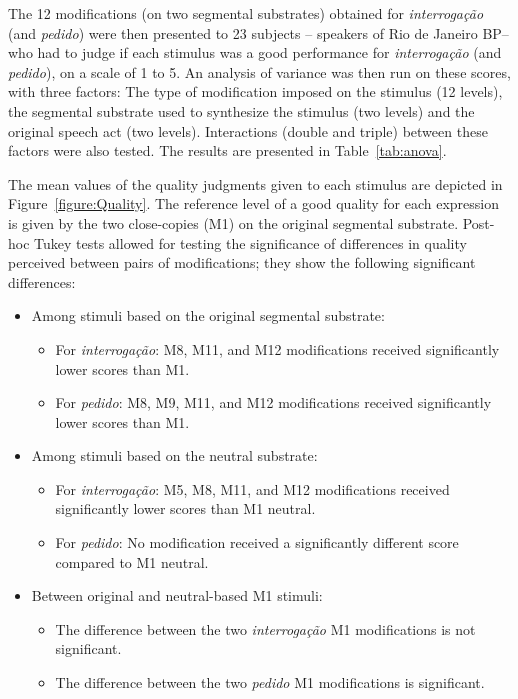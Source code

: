 \documentclass[output=paper]{LSP/langsci}
\begin{document}
The 12 modifications (on two segmental substrates) obtained for \textit{interrogação} (and \textit{pedido}) were then presented to 23 subjects -- speakers of Rio de Janeiro BP--who had to judge if each stimulus was a good performance for \textit{interrogação} (and \textit{pedido}), on a scale of 1 to 5. 
An analysis of variance was then run on these scores, with three factors: The type of modification imposed on the stimulus (12 levels), the segmental substrate used to synthesize the stimulus (two levels) and the original speech act (two levels). 
Interactions (double and triple) between these factors were also tested. 
The results are presented in Table~\ref{tab:anova}.



The mean values of the quality judgments given to each stimulus are depicted in Figure~\ref{figure:Quality}. 
The reference level of a good quality for each expression is given by the two close-copies (M1) on the original segmental substrate. 
Post-hoc Tukey tests allowed for testing the significance of differences in quality perceived between pairs of modifications; they show the following significant differences:
\begin{itemize}
\item Among stimuli based on the original segmental substrate:
\begin{itemize}
\item For \textit{interrogação}: M8, M11, and M12 modifications received significantly lower scores than M1.
\item For \textit{pedido}: M8, M9, M11, and M12 modifications received significantly lower scores than M1.
\end{itemize}
\item Among stimuli based on the neutral substrate:
\begin{itemize}
\item For \textit{interrogação}: M5, M8, M11, and M12 modifications received significantly lower scores than M1 neutral.
\item For \textit{pedido}: No modification received a significantly different score compared to M1 neutral.
\end{itemize}
\item Between original and neutral-based M1 stimuli:
\begin{itemize}
\item The difference between the two \textit{interrogação} M1 modifications is not significant.
\item The difference between the two \textit{pedido} M1 modifications is significant.
\end{itemize}
\end{itemize}
\end{document}
